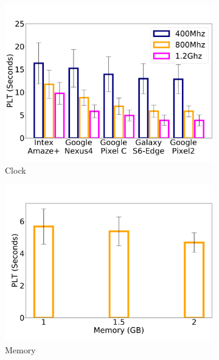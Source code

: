 \begin{figure}[t]
    \begin{subfigure}[b]{0.33\textwidth}
        \centering
        \includegraphics[width=1\linewidth]{sections/device-work/clock-device}
        \caption{Clock}
    \end{subfigure}
    \begin{subfigure}[b]{0.33\textwidth}
        \centering
        \includegraphics[width=1\linewidth]{sections/device-work/plt-memory}
        \caption{Memory}
    \end{subfigure}%
    \begin{subfigure}[b]{0.33\textwidth}
        \centering

\end{subfigure}
\end{figure}
